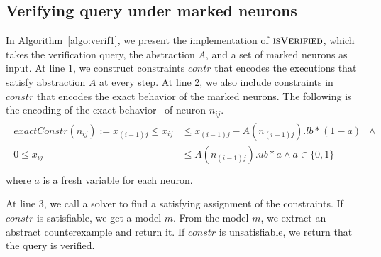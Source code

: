 









\subsection{Verifying query under marked neurons}
\label{sec:verif}
In Algorithm~\ref{algo:verif1}, we present the implementation of 
$\textsc{isVerified}$, which takes the verification query, the \deeppoly{} abstraction $A$,
and a set of marked neurons as input.
At line 1, we construct constraints $contr$ that encodes the executions that satisfy abstraction
$A$ at every step.
At line 2, we also include constraints in $constr$ that encodes the exact behavior of the marked
neurons. The following is the encoding of the exact behavior~\cite{tjeng2017evaluating} of neuron $n_{ij}$.
\begin{align}
    \label{eq:reluexact}
    \begin{split}
      exactConstr(n_{ij}) := x_{(i-1)j} \leq x_{ij} &\leq x_{(i-1)j} - A(n_{(i-1)j}).lb*(1-a) \;\;\land  \\
        0 \leq x_{ij} &\leq A(n_{(i-1)j}).ub*a \land a \in \{0,1\} \\ 
    \end{split}
\end{align}
where $a$ is a fresh variable for each neuron.

At line 3, we call a solver to find a satisfying assignment of the constraints.
If $constr$ is satisfiable, we get a model $m$.
From the model $m$, we extract an abstract counterexample and return it.
If $constr$ is unsatisfiable, we return that the query is verified.



